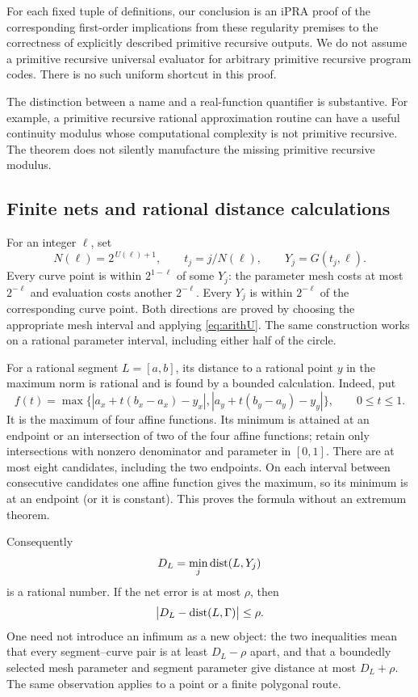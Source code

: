 For each fixed tuple of definitions, our conclusion is an iPRA proof of
the corresponding first-order implications from these regularity
premises to the correctness of explicitly described primitive recursive
outputs. We do not assume a primitive recursive universal evaluator
for arbitrary primitive recursive program codes. There is no such
uniform shortcut in this proof.

The distinction between a name and a real-function quantifier is
substantive. For example, a primitive recursive rational approximation
routine can have a useful continuity modulus whose computational
complexity is not primitive recursive. The theorem does not silently
manufacture the missing primitive recursive modulus.

\subsection{Finite nets and rational distance calculations}
\label{sec:nets}

For an integer $\ell$, set
\begin{equation}
 N(\ell)=2^{\,U(\ell)+1},\qquad
 t_j=j/N(\ell),\qquad Y_j=G(t_j,\ell).
 \label{eq:net}
\end{equation}
Every curve point is within $2^{1-\ell}$ of some $Y_j$:
the parameter mesh costs at most $2^{-\ell}$ and evaluation costs
another $2^{-\ell}$. Every $Y_j$ is within $2^{-\ell}$ of the
corresponding curve point. Both directions are proved by choosing the
appropriate mesh interval and applying \eqref{eq:arithU}.
The same construction works on a rational parameter interval, including
either half of the circle.

For a rational segment $L=[a,b]$, its distance to a rational point $y$
in the maximum norm is rational and is found by a bounded calculation.
Indeed, put
\[
 f(t)=\max\{|a_x+t(b_x-a_x)-y_x|,
             |a_y+t(b_y-a_y)-y_y|\},\qquad 0\le t\le1.
\]
It is the maximum of four affine functions. Its minimum is attained at
an endpoint or an intersection of two of the four affine functions;
retain only intersections with nonzero denominator and parameter in
$[0,1]$. There are at most eight candidates, including the two
endpoints. On each interval between consecutive candidates one affine
function gives the maximum, so its minimum is at an endpoint (or it is
constant). This proves the formula without an extremum theorem.

Consequently
\[
 D_L=\min_j\operatorname{dist}(L,Y_j)
\]
is a rational number. If the net error is at most $\rho$, then
\begin{equation}
  \big|D_L-\operatorname{dist}(L,\Gamma)\big|\le\rho.
  \label{eq:distance-net}
\end{equation}
One need not introduce an infimum as a new object: the two inequalities
mean that every segment--curve pair is at least $D_L-\rho$ apart, and
that a boundedly selected mesh parameter and segment parameter give
distance at most $D_L+\rho$. The same observation applies to a point
or a finite polygonal route.


